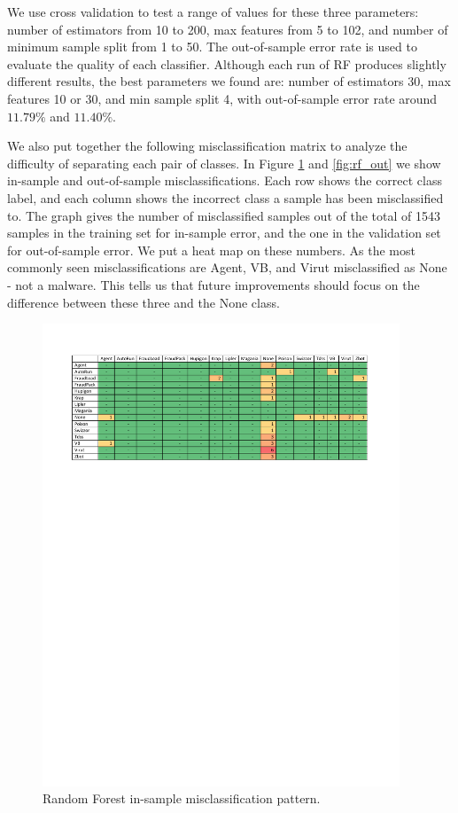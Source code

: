 \documentclass[submit]{harvardml}
\begin{document}
We use cross validation to test a range of values for these three parameters: number of estimators from 10 to 200, max features from 5 to 102, and number of minimum sample split from 1 to 50. The out-of-sample error rate is used to evaluate the quality of each classifier. Although each run of RF produces slightly different results, the best parameters we found are: number of estimators 30, max features 10 or 30, and min sample split 4, with out-of-sample error rate around $11.79\%$ and $11.40\%$.

We also put together the following misclassification matrix to analyze the difficulty of separating each pair of classes. In Figure \ref{fig:rf_in} and \ref{fig:rf_out} we show in-sample and out-of-sample misclassifications. Each row shows the correct class label, and each column shows the incorrect class a sample has been misclassified to. The graph gives the number of misclassified samples out of the total of 1543 samples in the training set for in-sample error, and the one in the validation set for out-of-sample error. We put a heat map on these numbers. As the most commonly seen misclassifications are Agent, VB, and Virut misclassified as None - not a malware. This tells us that future improvements should focus on the difference between these three and the None class.

\begin{figure}[htbp]
\centering
\includegraphics[width=0.95\textwidth]{RF_in}
\caption{Random Forest in-sample misclassification pattern.}
\label{fig:rf_in}
\end{figure}
\end{document}
